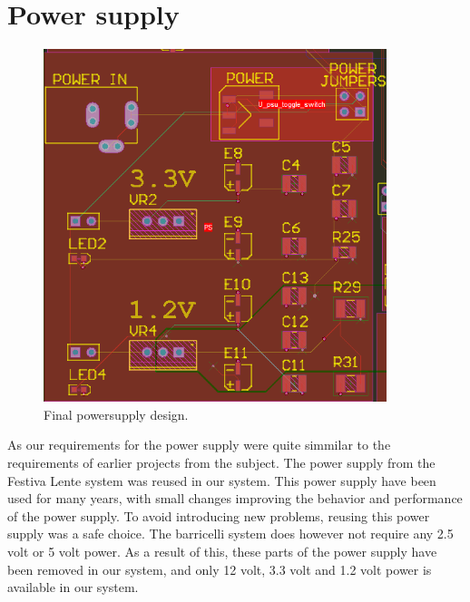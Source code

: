 \section {Power supply}

\begin{figure}
\centering
\includegraphics[width=10cm,keepaspectratio]{pcb/powersuplyphoto.png}
\caption{Final powersupply design. }
\label{figure:powersuplyphoto}
\end{figure}


As our requirements for the power supply were quite simmilar to the requirements of earlier projects from the subject.
The power supply from the Festiva Lente system was reused in our system.
This power supply have been used for many years, with small changes improving the behavior and performance of the power supply.
To avoid introducing new problems, reusing this power supply was a safe choice.
The barricelli system does however not require any 2.5 volt or 5 volt power.
As a result of this, these parts of the power supply have been removed in our system, and only 12 volt, 3.3 volt and 1.2 volt power is available in our system.



